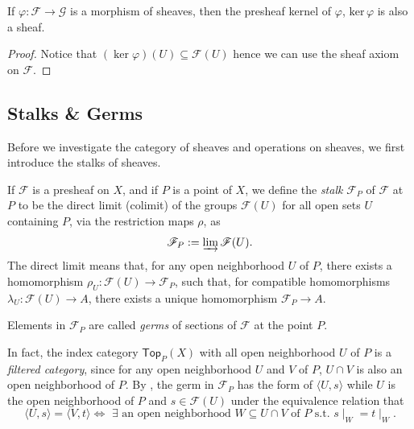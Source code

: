 \documentclass[11pt]{article}
\begin{document}
\begin{lemma}
    If $\varphi: \mathscr{F} \to \mathscr{G}$ is a morphism 
    of sheaves, then the presheaf kernel of $\varphi$, 
    $\mathrm{ker}\,\varphi$ is also a sheaf. 
\end{lemma}

\begin{proof}
    Notice that $ (\ker \varphi) (U)  \subseteq \mathscr{F}(U) $ 
    hence we can use the sheaf axiom on $ \mathscr{F} $. 
\end{proof}

\subsection{Stalks \& Germs}

Before we investigate the category of sheaves and operations on 
sheaves, we first introduce the stalks of sheaves. 

\begin{definition}[Stalks]
    If $\mathscr{F}$ is a presheaf on $X$, and if $P$ is a point 
    of $X$, we define the \emph{stalk} $\mathscr{F}_{P}$ of 
    $\mathscr{F}$ at $P$ to be the direct limit (colimit) 
    of the groups $\mathscr{F}(U)$ for all open sets $U$ 
    containing $P$, via the restriction maps 
    $\rho$, as 
    $$\mathscr{F}_{P}:= \varinjlim \mathscr{F}(U).$$
    The direct limit means that, for any open neighborhood $ U $ 
    of $ P $, there exists a homomorphism 
    $ \rho_{U} : \mathscr{F}(U) \to \mathscr{F}_{P}$, 
    such that, for compatible homomorphisms $ \lambda_{U}: \mathscr{F}(U) \to A $, 
    there exists a unique homomorphism $ \mathscr{F}_{P} \to A $. 

    Elements in $ \mathscr{F}_{P} $ are called 
    \emph{germs} of sections of $ \mathscr{F} $ at the point $ P $. 

    In fact, the index category $\mathsf{Top}_{P}(X)$ 
    with all open neighborhood $U$ of $P$ is 
    a \emph{filtered category}, since for any open neighborhood 
    $ U $ and $ V $ of $ P $, $ U \cap V $ is also an open 
    neighborhood of $ P $. 
    By \cite[1.4 D]{vakilTheRisingSea}, 
    the germ in $\mathscr{F}_{P}$ has the form of $\langle U,s \rangle$ 
    while $ U $  is the open neighborhood of $P$ and 
    $s \in \mathscr{F}(U)$ under the equivalence relation
     that 
    $$\langle U,s \rangle = \langle V,t \rangle \Longleftrightarrow 
    \,\,\exists\text{ an open neighborhood }W\subseteq U \cap V 
    \text{ of }P \text{ s.t. } s\mid_{W}=t\mid_{W}.$$ 
\end{definition}
\end{document}
